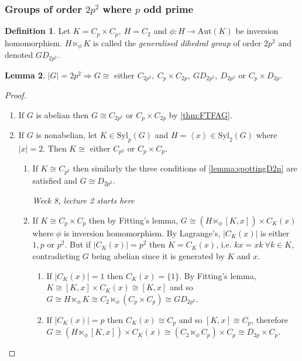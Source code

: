 \documentclass[a4paper]{article}
\newcommand{\la}{\left\langle}
\newcommand{\ra}{\right\rangle}
\newcommand{\Aut}{\text{Aut}}
\newcommand{\Syl}{\text{Syl}}
\theoremstyle{definition}
\newtheorem{defn}{Definition}[subsection]
\newtheorem{lemma}[defn]{Lemma}
\begin{document}
\subsubsection{Groups of order $2p^2$ where $p$ odd prime}
\begin{defn}
Let $K=C_p\times C_p,\ H=C_2$ and $\phi:H\rightarrow\Aut(K)$ be inversion homomorphism. $H\ltimes_\phi K$ is called the \textit{generalised dihedral group} of order $2p^2$ and denoted $GD_{2p^2}$.
\end{defn}

\begin{lemma}
$|G|=2p^2\Rightarrow G\cong$ either $C_{2p^2},\ C_p\times C_{2p},\ GD_{2p^2},\ D_{2p^2}$ or $C_p\times D_{2p}$.
\end{lemma}
\begin{proof}
\begin{enumerate}
\item If $G$ is abelian then $G\cong C_{2p^2}$ or $C_p\times C_{2p}$ by \ref{thm:FTFAG}.

\item If $G$ is nonabelian, let $K\in\Syl_p(G)$ and $H=\la x\ra\in\Syl_2(G)$ where $|x|=2$. Then $K\cong$ either $C_{p^2}$ or $C_p\times C_p$.
\begin{enumerate}
\item If $K\cong C_{p^2}$ then similarly the three conditions of \ref{lemma:spottingD2n} are satisfied and $G\cong D_{2p^2}$.
\begin{flushright}
\textit{Week 8, lecture 2 starts here}
\end{flushright}
\item If $K\cong C_p\times C_p$ then by Fitting's lemma, $G\cong (H\ltimes_\phi [K,x])\times C_K(x)$ where $\phi$ is inversion homomorphism. By Lagrange's, $|C_K(x)|$ is either $1,p$ or $p^2$. But if $|C_K(x)|=p^2$ then $K=C_K(x)$, i.e. $kx=xk \ \forall k\in K$, contradicting $G$ being abelian since it is generated by $K$ and $x$. 
\begin{enumerate}
\item If $|C_K(x)|=1$ then $C_K(x)=\{1\}$. By Fitting's lemma, $K\cong [K,x]\times C_K(x)\cong [K,x]$ and so $G\cong H\ltimes_\phi K\cong C_2\ltimes_\phi(C_p\times C_p)\cong GD_{2p^2}$.
\item If $|C_K(x)|=p$ then $C_K(x)\cong C_p$ and so $[K,x]\cong C_p$, therefore $G\cong (H\ltimes_\phi [K,x]) \times C_K(x)\cong (C_2\ltimes_\phi C_p) \times C_p\cong D_{2p}\times C_p$.
\end{enumerate}
\end{enumerate}
\end{enumerate}
\end{proof}
\end{document}
